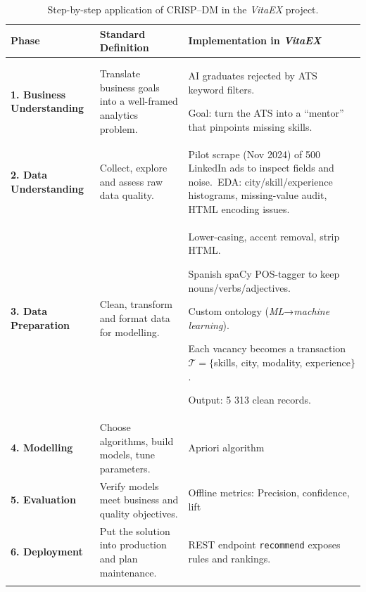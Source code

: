 \documentclass[runningheads]{llncs}
\begin{document}
\renewcommand{\arraystretch}{1.3}
\begin{longtable}{|>{\raggedright\arraybackslash}p{3.5cm}|p{4.6cm}|p{6.3cm}|}
	\hline
	\rowcolor{gray!20}\textbf{Phase} & \textbf{Standard Definition} & \textbf{Implementation in \emph{VitaEX}} \\ \hline
	\endhead
	\textbf{1. Business Understanding} &
	Translate business goals into a well-framed analytics problem. &
	AI graduates rejected by ATS keyword filters.\
	
	Goal: turn the ATS into a “mentor” that pinpoints missing skills.\
	
	\\ \hline
	
	\textbf{2. Data Understanding} &
	Collect, explore and assess raw data quality. &
	Pilot scrape (Nov 2024) of 500 LinkedIn ads to inspect fields and noise.\
	EDA: city/skill/experience histograms, missing-value audit, HTML encoding issues.\
	\\ \hline
	
	\textbf{3. Data Preparation} &
	Clean, transform and format data for modelling. &
	Lower-casing, accent removal, strip HTML.\
	
	Spanish spaCy POS-tagger to keep nouns/verbs/adjectives.\
	
	Custom ontology (\textit{ML}→\textit{machine learning}).\
	
	Each vacancy becomes a transaction $\mathcal{T}=\{$skills, city, modality, experience$\}$.\
	
	Output: 5 313 clean records. \\ \hline
	
	\textbf{4. Modelling} &
	Choose algorithms, build models, tune parameters. &
	Apriori algorithm \\ \hline
	
	\textbf{5. Evaluation} &
	Verify models meet business and quality objectives. &
	Offline metrics: Precision, confidence, lift
\\ \hline
	
	\textbf{6. Deployment} &
	Put the solution into production and plan maintenance. &
	REST endpoint \texttt{recommend} exposes rules and rankings.\
	
\\ \hline
	\caption{Step-by-step application of CRISP–DM in the \emph{VitaEX} project.}
	\label{tab:crispdm}
\end{longtable}


\end{document}

